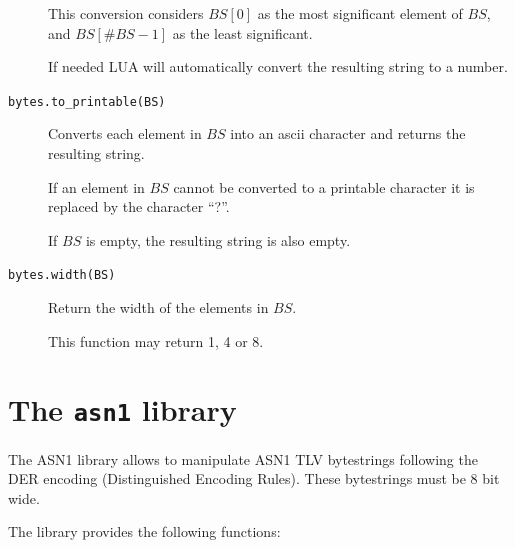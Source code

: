 \documentclass[11pt]{report}
\begin{document}
\begin{description}
{  This conversion considers $BS[0]$ as the most significant element of $BS$, 
  and $BS[\#BS-1]$ as the least significant. 
  
  If needed LUA will automatically convert the resulting string to a number.
}

\item[\texttt{bytes.to\_printable(BS)}]
{
  Converts each element in $BS$ into an ascii character and returns the
  resulting string.

  If an element in $BS$ cannot be converted to a printable character it
  is replaced by the character ``?''. 

  If $BS$ is empty, the resulting string is also empty.
}

\item[\texttt{bytes.width(BS)}]
{
  Return the width of the elements in $BS$.

  This function may return 1, 4 or 8.
}

\end{description}

\section{The \texttt{asn1} library}

The ASN1 library allows to manipulate ASN1 TLV bytestrings following the DER 
encoding (Distinguished Encoding Rules).
These bytestrings must be 8 bit wide.

The library provides the following functions:
\end{document}
